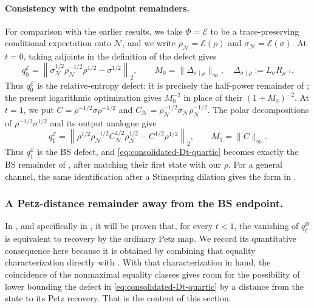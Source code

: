 \documentclass[11pt]{article}
\theoremstyle{remark}
\newcommand{\1}{\mathbbm{1}}
\begin{document}
\paragraph{Consistency with the endpoint remainders.}
For comparison with the earlier results, we take $\Phi=\mathcal E$ to be a
trace-preserving conditional expectation onto $\mathcal N$, and we write
$\rho_{\mathcal N}=\mathcal E(\rho)$ and
$\sigma_{\mathcal N}=\mathcal E(\sigma)$.  At $t=0$, taking adjoints
in the definition of the defect gives
\begin{equation*}
 q_0^{\mathcal E}
 =\left\lVert\sigma_{\mathcal N}^{1/2}
 \rho_{\mathcal N}^{-1/2}\rho^{1/2}-\sigma^{1/2}\right\rVert_2,
 \qquad
 M_0=\lVert\Delta_{\sigma\mid\rho}\rVert_\infty,
 \quad
 \Delta_{\sigma\mid\rho}:=L_\sigma R_{\rho^{-1}}.
\end{equation*}
Thus $q_0^{\mathcal E}$ is the relative-entropy defect: it is
precisely the half-power remainder of
\cite[Corollary~5.1, in particular (5.3)]{carlen2018recovery}; the
present logarithmic optimization gives $M_0^{-2}$ in place of their
$(1+M_0)^{-2}$.  At $t=1$, we put
$C=\rho^{-1/2}\sigma\rho^{-1/2}$ and
$C_{\mathcal N}=\rho_{\mathcal N}^{-1/2}
\sigma_{\mathcal N}\rho_{\mathcal N}^{-1/2}$.  The polar
decompositions of $\rho^{-1/2}\sigma^{1/2}$ and its output analogue
give
\begin{equation*}
 q_1^{\mathcal E}
 =\left\lVert
 \rho^{1/2}\rho_{\mathcal N}^{-1/2}C_{\mathcal N}^{1/2}
 \rho_{\mathcal N}^{1/2}-C^{1/2}\rho^{1/2}
 \right\rVert_2,
 \qquad M_1=\lVert C\rVert_\infty.
\end{equation*}
Thus $q_1^{\mathcal E}$ is the BS defect, and
\eqref{eq:consolidated-Dt-quartic} becomes exactly the BS remainder of
\cite[Theorem~5.3]{bluhm2020strengthened}, after matching their first
state with our $\rho$.  For a general channel, the same identification
after a Stinespring dilation gives the form in
\cite[Theorem~7.1]{bluhm2020strengthened}.

\subsubsection{A Petz-distance remainder away from the BS endpoint.}
 In , and specifically in 
, it will be proven that,
 for every $t<1$, the vanishing of $q_t^\Phi$ is equivalent to recovery
by the ordinary Petz map.  We record its
quantitative consequence here because it is obtained by combining
that equality characterization directly with
. With that characterization in hand, the coincidence of the
nonmaximal equality classes gives room for the possibility of lower bounding the defect in \eqref{eq:consolidated-Dt-quartic}
by a distance from the state to its Petz recovery. That is the content of this section.
\end{document}

